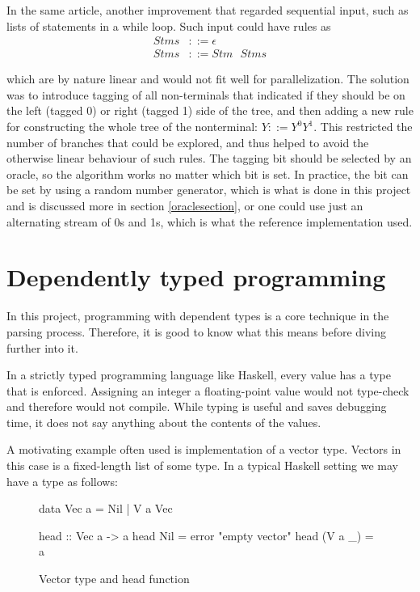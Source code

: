 \documentclass[a4paper,12pt,twosided]{report}
\begin{document}
In the same article, another improvement that regarded sequential input, such as
lists of statements in a while loop. Such input could have rules as
\begin{align*}
Stms &::= \epsilon \\
Stms &::= Stm\text{ }Stms
\end{align*}

which are by nature linear and would not fit well for parallelization. The
solution was to introduce tagging of all non-terminals that indicated if they
should be on the left (tagged 0) or right (tagged 1) side of the tree, and then
adding a new rule for constructing the whole tree of the nonterminal: $Y ::=
Y^0Y^1$. This restricted the number of branches that could be explored, and thus
helped to avoid the otherwise linear behaviour of such rules. The tagging bit
should be selected by an oracle, so the algorithm works no matter which bit is
set. In practice, the bit can be set by using a random number generator, which
is what is done in this project and is discussed more in section
\ref{oraclesection}, or one could use just an alternating stream of 0s and 1s,
which is what the reference implementation used. 

\section{Dependently typed programming}
In this project, programming with dependent types is a core technique in the
parsing process. Therefore, it is good to know what this means before diving
further into it.

In a strictly typed programming language like Haskell, every value has a type
that is enforced. Assigning an integer a floating-point value would not
type-check and therefore would not compile. While typing is useful and saves
debugging time, it does not say anything about the contents of the values.

A motivating example often used is implementation of a vector type. Vectors in
this case is a fixed-length list of some type. In a typical Haskell setting we 
may have a type as follows:

\begin{figure}[H]
\begin{code}
data Vec a = Nil | V a Vec

head :: Vec a -> a
head Nil = error "empty vector"
head (V a _) = a
\end{code}
\caption{Vector type and head function}
\end{figure}
\end{document}
